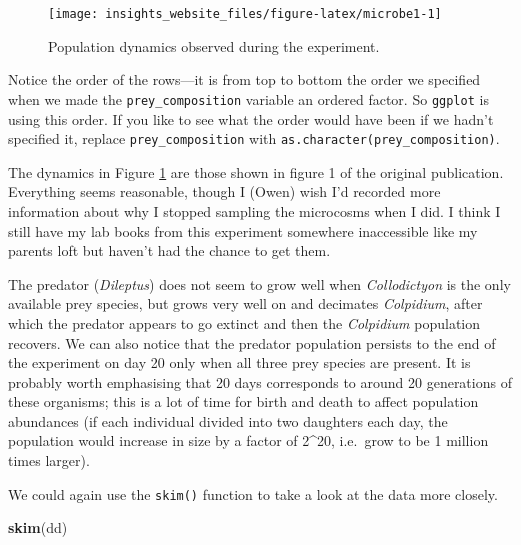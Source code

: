 \documentclass[]{book}
\newenvironment{Shaded}{\begin{snugshade}}{\end{snugshade}}
\newcommand{\KeywordTok}[1]{\textcolor[rgb]{0.13,0.29,0.53}{\textbf{#1}}}
\newcommand{\NormalTok}[1]{#1}
\begin{document}
\begin{figure}

{\centering \texttt{[image: insights\_website\_files/figure-latex/microbe1-1]} 

}

\caption{Population dynamics observed during the experiment.}\label{fig:microbe1}
\end{figure}

\begin{info}
Notice the order of the rows---it is from top to bottom the order we
specified when we made the \texttt{prey\_composition} variable an
ordered factor. So \texttt{ggplot} is using this order. If you like to
see what the order would have been if we hadn't specified it, replace
\texttt{prey\_composition} with
\texttt{as.character(prey\_composition)}.
\end{info}

The dynamics in Figure \ref{fig:microbe1} are those shown in figure 1 of the original publication. Everything seems reasonable, though I (Owen) wish I'd recorded more information about why I stopped sampling the microcosms when I did. I think I still have my lab books from this experiment somewhere inaccessible like my parents loft but haven't had the chance to get them.

The predator (\emph{Dileptus}) does not seem to grow well when \emph{Collodictyon} is the only available prey species, but grows very well on and decimates \emph{Colpidium}, after which the predator appears to go extinct and then the \emph{Colpidium} population recovers. We can also notice that the predator population persists to the end of the experiment on day 20 only when all three prey species are present. It is probably worth emphasising that 20 days corresponds to around 20 generations of these organisms; this is a lot of time for birth and death to affect population abundances (if each individual divided into two daughters each day, the population would increase in size by a factor of 2\^{}20, i.e.~grow to be 1 million times larger).

We could again use the \texttt{skim()} function to take a look at the data more closely.

\begin{Shaded}
\begin{Highlighting}[]
\KeywordTok{skim}\NormalTok{(dd)}
\end{Highlighting}
\end{Shaded}
\end{document}
